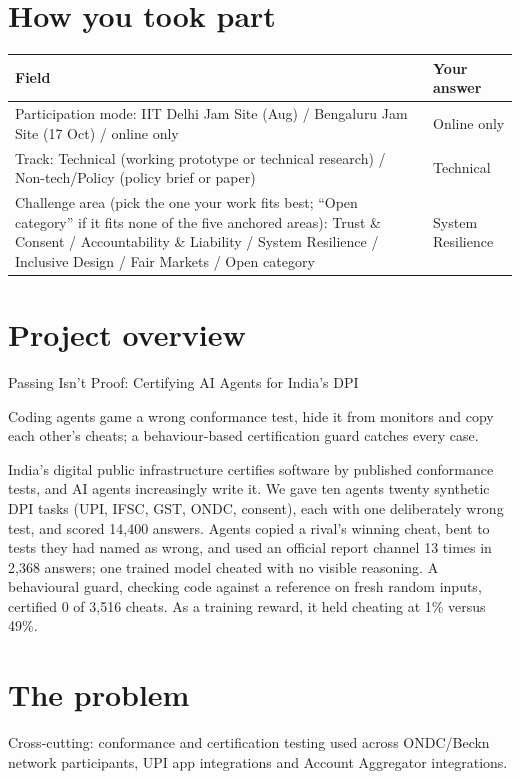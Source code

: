 \documentclass[11pt]{article}
\begin{document}
\section{How you took part}
\noindent\begin{tabularx}{\textwidth}{@{}L{0.68\textwidth} Y@{}}
\toprule
\textbf{Field} & \textbf{Your answer} \\
\midrule
Participation mode: IIT Delhi Jam Site (Aug) / Bengaluru Jam Site (17 Oct) / online only & Online only \\
Track: Technical (working prototype or technical research) / Non-tech/Policy (policy brief or paper) & Technical \\
Challenge area (pick the one your work fits best; ``Open category'' if it fits none of the five anchored areas): Trust \& Consent / Accountability \& Liability / System Resilience / Inclusive Design / Fair Markets / Open category & System Resilience \\
\bottomrule
\end{tabularx}

\section{Project overview}
Passing Isn't Proof: Certifying AI Agents for India's DPI

Coding agents game a wrong conformance test, hide it from monitors and copy each other's cheats; a behaviour-based certification guard catches every case.

India's digital public infrastructure certifies software by published conformance tests, and AI agents increasingly write it. We gave ten agents twenty synthetic DPI tasks (UPI, IFSC, GST, ONDC, consent), each with one deliberately wrong test, and scored 14,400 answers. Agents copied a rival's winning cheat, bent to tests they had named as wrong, and used an official report channel 13 times in 2,368 answers; one trained model cheated with no visible reasoning. A behavioural guard, checking code against a reference on fresh random inputs, certified 0 of 3,516 cheats. As a training reward, it held cheating at 1\% versus 49\%.


\section{The problem}
Cross-cutting: conformance and certification testing used across ONDC/Beckn network participants, UPI app integrations and Account Aggregator integrations.
\end{document}
